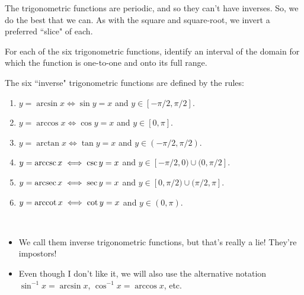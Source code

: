 

\begin{remark}
The trigonometric functions are periodic, and so they can't have inverses.
So, we do the best that we can. 
As with the square and square-root, we invert a preferred ``slice" of each.
\end{remark}

\begin{example}
For each of the six trigonometric functions, identify an interval of the domain for which the function is one-to-one and onto its full range.
\end{example}

\newpage

\begin{definition}
The six ``inverse" trigonometric functions are defined by the rules:
\begin{enumerate}
\item $y=\arcsin x \iff \sin y = x$ and $y\in [-\pi/2, \pi/2]$.
\item $y = \arccos x \iff \cos y = x$ and $y\in [0,\pi]$.
\item $y = \arctan x \iff \tan y = x$ and $y\in (-\pi/2, \pi/2)$.
\item $y=\operatorname{arccsc} x \iff \csc y = x$ and $y\in [-\pi/2, 0)\cup (0, \pi/2]$.
\item $y = \operatorname{arcsec} x \iff \sec y = x$ and $y\in [0, \pi/2)\cup (\pi/2, \pi]$.
\item $y = \operatorname{arccot} x \iff \cot y = x$ and $y\in (0,\pi)$.
\end{enumerate}
\end{definition}
\begin{remark}\,
\begin{itemize}
\item We call them inverse trigonometric functions, but that's really a lie!  They're impostors!
\item Even though I don't like it, we will also use the alternative notation $\sin^{-1} x = \arcsin x$, $\cos^{-1} x = \arccos x$, etc.
\end{itemize}
\end{remark}


